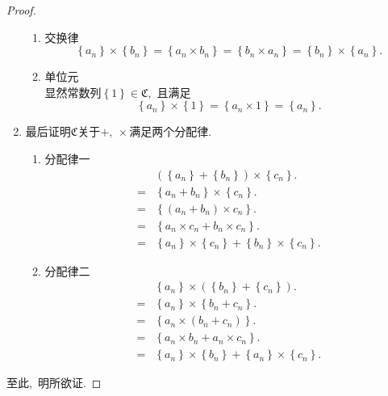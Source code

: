 \documentclass[UTF8, twoside]{ctexart}
\theoremstyle{nonumberplain}
\newtheorem{proof}{\heiti 证明}  %
\theoremstyle{nonumberplain}
\theoremstyle{plain}
\begin{document}
\begin{proof}
\begin{enumerate}
\begin{enumerate}
				\item 交换律 
				\[
					\left\{ {{a}_{n}} \right\}\times \left\{ {{b}_{n}} \right\}=\left\{ {{a}_{n}}\times {{b}_{n}} \right\}=\left\{ {{b}_{n}}\times {{a}_{n}} \right\}=\left\{ {{b}_{n}} \right\}\times \left\{ {{a}_{n}} \right\}.	
				\]
				\vskip 0.3cm
				
				\item 单位元 \\
				显然常数列$\left\{ 1 \right\}\in \mathfrak{C}$,\ 且满足
				\[
					\left\{ {{a}_{n}} \right\}\times \left\{ 1 \right\}=\left\{ {{a}_{n}}\times 1 \right\}=\left\{ {{a}_{n}} \right\}.
				\]
			\end{enumerate}
			\vskip 0.3cm
			
			\item 最后证明$\mathfrak{C}$关于$+,\ \times$满足两个分配律.\ 
			\vskip 0.3cm
			\begin{enumerate}
				\item 分配律一
				\begin{align*}
					& \left( \left\{ {{a}_{n}} \right\}+\left\{ {{b}_{n}} \right\} \right)\times \left\{ {{c}_{n}} \right\}. \\ 
					=&\left\{ {{a}_{n}}+{{b}_{n}} \right\}\times \left\{ {{c}_{n}} \right\}. \\ 
					=&\left\{ \left( {{a}_{n}}+{{b}_{n}} \right)\times {{c}_{n}} \right\}. \\ 
					=&\left\{ {{a}_{n}}\times {{c}_{n}}+{{b}_{n}}\times {{c}_{n}} \right\}. \\ 
					=&\left\{ {{a}_{n}} \right\}\times \left\{ {{c}_{n}} \right\}+\left\{ {{b}_{n}} \right\}\times \left\{ {{c}_{n}} \right\}. 
				\end{align*}
				\vskip 0.3cm
				
				\item 分配律二 
				\begin{align*}
					& \left\{ {{a}_{n}} \right\}\times \left( \left\{ {{b}_{n}} \right\}+\left\{ {{c}_{n}} \right\} \right). \\ 
					=&\left\{ {{a}_{n}} \right\}\times \left\{ {{b}_{n}}+{{c}_{n}} \right\}. \\ 
					=&\left\{ {{a}_{n}}\times \left( {{b}_{n}}+{{c}_{n}} \right) \right\}. \\ 
					=&\left\{ {{a}_{n}}\times {{b}_{n}}+{{a}_{n}}\times {{c}_{n}} \right\}. \\ 
					=&\left\{ {{a}_{n}} \right\}\times \left\{ {{b}_{n}} \right\}+\left\{ {{a}_{n}} \right\}\times \left\{ {{c}_{n}} \right\}. 
				\end{align*}
			\end{enumerate}
		\end{enumerate}
		至此,\ 明所欲证.
	\end{proof}
	
\end{document}
